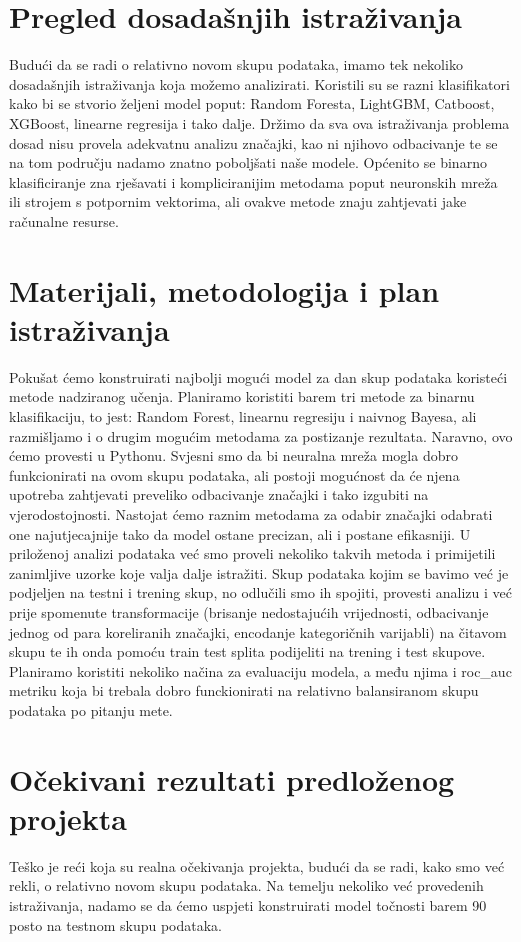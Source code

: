 \documentclass[a4paper,12pt]{article}
\begin{document}
\section{Pregled dosadašnjih istraživanja}
Budući da se radi o relativno novom skupu podataka, imamo tek nekoliko dosadašnjih istraživanja koja možemo analizirati. Koristili su se razni klasifikatori kako bi se stvorio željeni model poput: Random Foresta, LightGBM, Catboost, XGBoost, linearne regresija i tako dalje. Držimo da sva ova istraživanja problema dosad nisu provela adekvatnu analizu značajki, kao ni njihovo odbacivanje te se na tom području nadamo znatno poboljšati naše modele. Općenito se binarno klasificiranje zna rješavati i kompliciranijim metodama poput neuronskih mreža ili strojem s potpornim vektorima, ali ovakve metode znaju zahtjevati jake računalne resurse.

\newpage
\section{Materijali, metodologija i plan istraživanja}
Pokušat ćemo konstruirati najbolji mogući model za dan skup podataka koristeći metode nadziranog učenja. Planiramo koristiti barem tri metode za binarnu klasifikaciju, to jest: Random Forest, linearnu regresiju i naivnog Bayesa, ali razmišljamo i o drugim mogućim metodama za postizanje rezultata. Naravno, ovo ćemo provesti u Pythonu. Svjesni smo da bi neuralna mreža mogla dobro funkcionirati na ovom skupu podataka, ali postoji mogućnost da će njena upotreba zahtjevati preveliko odbacivanje značajki i tako izgubiti na vjerodostojnosti. Nastojat ćemo raznim metodama za odabir značajki odabrati one najutjecajnije tako da model ostane precizan, ali i postane efikasniji. U priloženoj analizi podataka već smo proveli nekoliko takvih metoda i primijetili zanimljive uzorke koje valja dalje istražiti. Skup podataka kojim se bavimo već je podjeljen na testni i trening skup, no odlučili smo ih spojiti, provesti analizu i već prije spomenute transformacije (brisanje nedostajućih vrijednosti, odbacivanje jednog od para koreliranih značajki, encodanje kategoričnih varijabli) na čitavom skupu te ih onda pomoću train test splita podijeliti na trening i test skupove. Planiramo koristiti nekoliko načina za evaluaciju modela, a među njima i roc\_auc metriku koja bi trebala dobro funckionirati na relativno balansiranom skupu podataka po pitanju mete.

\newline
\section{Očekivani rezultati predloženog projekta}
Teško je reći koja su realna očekivanja projekta, budući da se radi, kako smo već rekli, o relativno novom skupu podataka. Na temelju nekoliko već provedenih istraživanja, nadamo se da ćemo uspjeti konstruirati model točnosti barem 90 posto na testnom skupu podataka.
\end{document}
